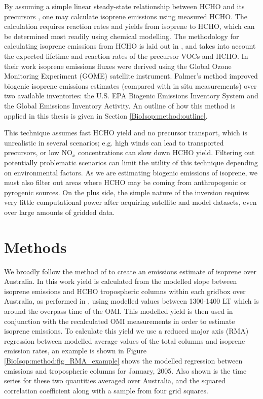       By assuming a simple linear steady-state relationship between HCHO and its precursors \parencite{Palmer2003, Palmer2006, Millet2006}, one may calculate isoprene emissions using measured HCHO.
      The calculation requires reaction rates and yields from isoprene to HCHO, which can be determined most readily using chemical modelling.
      The methodology for calculating isoprene emissions from HCHO is laid out in \textcite{Palmer2003}, and takes into account the expected lifetime and reaction rates of the precursor VOCs and HCHO.
      In their work isoprene emissions fluxes were derived using the Global Ozone Monitoring Experiment (GOME) satellite instrument.
      Palmer's method improved biogenic isoprene emissions estimates (compared with in situ measurements) over two available inventories: the U.S. EPA Biogenic Emissions Inventory System and the Global Emissions Inventory Activity. %
      An outline of how this method is applied in this thesis is given in Section \ref{BioIsop:method:outline}.
      
      This technique assumes fast HCHO yield and no precursor transport, which is unrealistic in several scenarios; e.g. high winds can lead to transported precursors, or low NO$_x$ concentrations can slow down HCHO yield.
      Filtering out potentially problematic scenarios can limit the utility of this technique depending on environmental factors.
      As we are estimating biogenic emissions of isoprene, we must also filter out areas where HCHO may be coming from anthropogenic or pyrogenic sources.
      On the plus side, the simple nature of the inversion requires very little computational power after acquiring satellite and model datasets, even over large amounts of gridded data.
      
    
\section{Methods}
  \label{BioIsop:method}
  
  
  We broadly follow the method of \textcite{Palmer2001} to create an emissions estimate of isoprene over Australia.
  In this work yield is calculated from the modelled slope between isoprene emissions and HCHO tropospheric columns within each gridbox over Australia, as performed in \textcite{Palmer2003}, using modelled values between 1300-1400 LT which is around the overpass time of the OMI.
  This modelled yield is then used in conjunction with the recalculated OMI measurements in order to estimate isoprene emissions.
  To calculate this yield we use a reduced major axis (RMA) regression between modelled average values of the total columns and isoprene emission rates, an example is shown in Figure \ref{BioIsop:method:fig_RMA_example} shows the modelled regression between emissions and tropospheric columns for January, 2005. Also shown is the time series for these two quantities averaged over Australia, and the squared correlation coefficient along with a sample from four grid squares.
  
